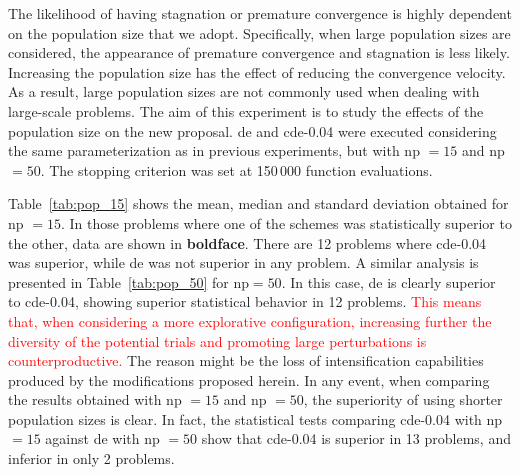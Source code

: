 \documentclass[review,3p]{elsarticle}
\newcommand{\CDE}{c{\sc de}}
\newcommand{\DE}{{\sc de}}
\newcommand{\NP}{{\sc np}}
\begin{document}
The likelihood of having stagnation or premature convergence is highly dependent on the population size that we adopt.
%
Specifically, when large population sizes are considered, the appearance of premature convergence and stagnation is less likely.
%
Increasing the population size has the effect of reducing the convergence velocity. As a result, large population sizes
are not commonly used when dealing with large-scale problems.
%
The aim of this experiment is to study the effects of the population size on the new proposal.
%
\DE{} and \CDE{}-0.04 were executed considering the same parameterization
as in previous experiments, but with \NP{} $= 15$ and \NP{} $= 50$.
%
The stopping criterion was set at 150$\,$000 function evaluations.

Table~\ref{tab:pop_15} shows the mean, median and standard deviation obtained for \NP{} $= 15$.
%
In those problems where one of the schemes was statistically superior to the other, data are shown in {\bf boldface}.
%
There are 12 problems where \CDE{}-0.04 was superior, while \DE{} was not superior in any problem.
%
A similar analysis is presented in Table~\ref{tab:pop_50} for \NP{}$ = 50$.
%
In this case, \DE{} is clearly superior to \CDE{}-0.04, showing superior statistical behavior in 12 problems.
%
\textcolor{red}{
This means that, when considering a more explorative configuration, increasing further the diversity of the potential
trials and promoting large perturbations is counterproductive.
}
%
The reason might be the loss of intensification capabilities produced by the modifications proposed herein.
%
In any event, when comparing the results obtained with \NP{} $= 15$ and \NP{} $= 50$, the superiority of using shorter population sizes is clear.
%
In fact, the statistical tests comparing \CDE{}-0.04 with \NP{} $= 15$ against \DE{} with \NP{} $= 50$ show that \CDE{}-0.04 is superior
in 13 problems, and inferior in only 2 problems.



\end{document}
